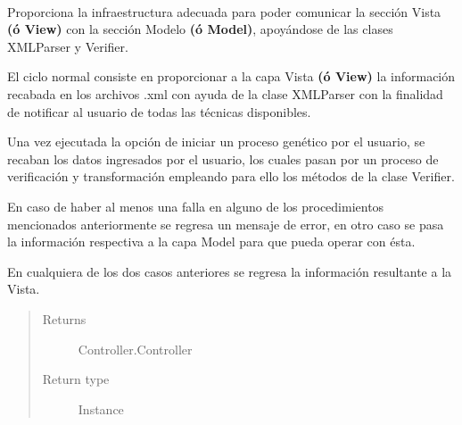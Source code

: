 \documentclass[letterpaper,10pt,english]{sphinxmanual}
\begin{document}
\begin{fulllineitems}
\label{Controller/ControllerClass:Controller.Controller.Controller}~
\begin{DUlineblock}{0em}
\item[] Proporciona la infraestructura adecuada para poder comunicar la sección Vista
\textbf{(ó View)} con la sección Modelo \textbf{(ó Model)}, apoyándose de las clases XMLParser y Verifier.
\item[] 
\item[] El ciclo normal consiste en proporcionar a la capa Vista \textbf{(ó View)} la información
recabada en los archivos .xml con ayuda de la clase XMLParser con la finalidad de notificar
al usuario de todas las técnicas disponibles.
\item[] 
\item[] Una vez ejecutada la opción de iniciar un proceso genético por el usuario, se recaban los
datos ingresados por el usuario, los cuales pasan por un proceso de verificación y transformación
empleando para ello los métodos de la clase Verifier. 
\item[] 
\item[] En caso de haber al menos una falla en alguno de los procedimientos mencionados anteriormente
se regresa un mensaje de error, en otro caso se pasa la información respectiva a la
capa Model para que pueda operar con ésta.
\item[] 
\item[] En cualquiera de los dos casos anteriores se regresa la información resultante a la Vista.
\end{DUlineblock}
\begin{quote}\begin{description}
\item[{Returns}] \leavevmode
Controller.Controller

\item[{Return type}] \leavevmode
Instance

\end{description}\end{quote}


\end{fulllineitems}
\end{document}
